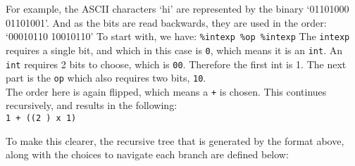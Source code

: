 For example, the ASCII characters `hi' are represented by the binary `01101000 01101001'.
And as the bits are read backwards, they are used in the order: `00010110 10010110'
To start with, we have:
\texttt{\%intexp \%op \%intexp}
The \texttt{intexp} requires a single bit, and which in this case is \texttt{0}, which means it is an \texttt{int}. An \texttt{int} requires 2 bits to choose, which is \texttt{00}.
Therefore the first int is 1. The next part is the \texttt{op} which also requires two bits, \texttt{10}.\\
The order here is again flipped, which means a \texttt{+} is chosen.
This continues recursively, and results in the following: \\
\texttt{1 + ((2 ) x 1)}\par
To make this clearer, the recursive tree that is generated by the format above, along with the choices to navigate each branch are defined below:

